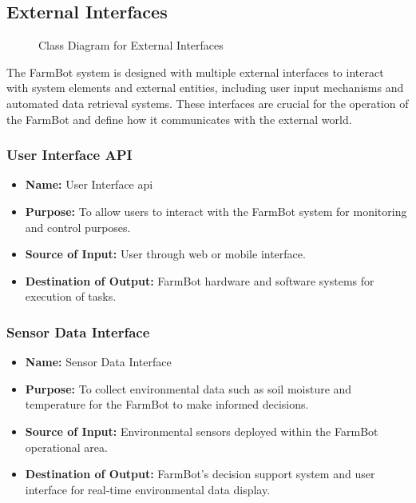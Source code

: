 \subsection{External Interfaces}
\begin{figure}[H]
    \centering

\caption{Class Diagram for External Interfaces}
\end{figure}

The FarmBot system is designed with multiple external interfaces to interact with system elements and external entities, including user input mechanisms and automated data retrieval systems. These interfaces are crucial for the operation of the FarmBot and define how it communicates with the external world.

\subsubsection{User Interface API}
\begin{itemize}
    \item \textbf{Name:} User Interface \gls{api}
    \item \textbf{Purpose:} To allow users to interact with the FarmBot system for monitoring and control purposes.
    \item \textbf{Source of Input:} User through web or mobile interface.
    \item \textbf{Destination of Output:} FarmBot hardware and software systems for execution of tasks.
\end{itemize}


\subsubsection{Sensor Data Interface}
\begin{itemize}
    \item \textbf{Name:} Sensor Data Interface
    \item \textbf{Purpose:} To collect environmental data such as soil moisture and temperature for the FarmBot to make informed decisions.
    \item \textbf{Source of Input:} Environmental sensors deployed within the FarmBot operational area.
    \item \textbf{Destination of Output:} FarmBot's decision support system and user interface for real-time environmental data display.
\end{itemize}

